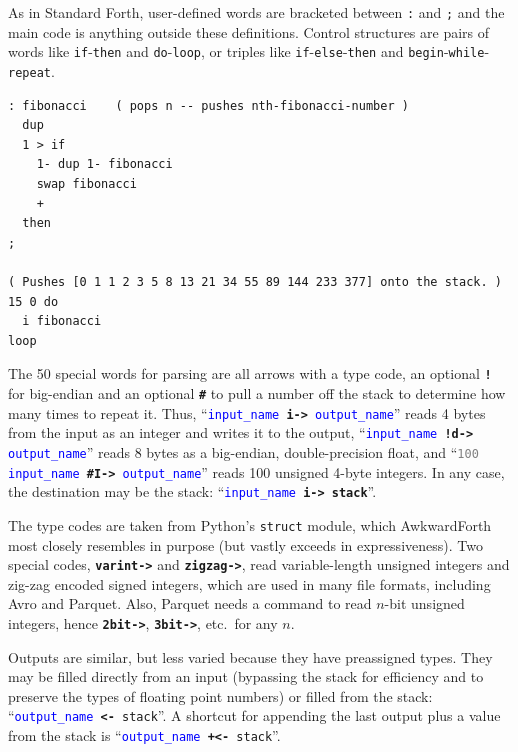 \documentclass{webofc}
\begin{document}
As in Standard Forth, user-defined words are bracketed between \texttt{:} and \texttt{;} and the main code is anything outside these definitions. Control structures are pairs of words like \texttt{if}-\texttt{then} and \texttt{do}-\texttt{loop}, or triples like \texttt{if}-\texttt{else}-\texttt{then} and \texttt{begin}-\texttt{while}-\texttt{repeat}.

\begin{verbatim}
: fibonacci    ( pops n -- pushes nth-fibonacci-number )
  dup
  1 > if
    1- dup 1- fibonacci
    swap fibonacci
    +
  then
;

( Pushes [0 1 1 2 3 5 8 13 21 34 55 89 144 233 377] onto the stack. )
15 0 do
  i fibonacci
loop
\end{verbatim}

The 50 special words for parsing are all arrows with a type code, an optional \textcolor{OliveGreen}{\tt\textbf{!}} for big-endian and an optional \textcolor{OliveGreen}{\tt\textbf{\#}} to pull a number off the stack to determine how many times to repeat it. Thus, ``{\tt \textcolor{blue}{input\_name} \textcolor{OliveGreen}{\textbf{i->}} \textcolor{blue}{output\_name}}'' reads 4 bytes from the input as an integer and writes it to the output, ``{\tt \textcolor{blue}{input\_name} \textcolor{OliveGreen}{\textbf{!d->}} \textcolor{blue}{output\_name}}'' reads 8 bytes as a big-endian, double-precision float, and ``{\tt \textcolor{gray}{100} \textcolor{blue}{input\_name} \textcolor{OliveGreen}{\textbf{\#I->}} \textcolor{blue}{output\_name}}'' reads 100 unsigned 4-byte integers. In any case, the destination may be the stack: ``{\tt \textcolor{blue}{input\_name} \textcolor{OliveGreen}{\textbf{i->}} \textcolor{OliveGreen}{\textbf{stack}}}''.

The type codes are taken from Python's \texttt{struct} module, which AwkwardForth most closely resembles in purpose (but vastly exceeds in expressiveness). Two special codes, \textcolor{OliveGreen}{\tt\textbf{varint->}} and \textcolor{OliveGreen}{\tt\textbf{zigzag->}}, read variable-length unsigned integers and zig-zag encoded signed integers, which are used in many file formats, including Avro and Parquet. Also, Parquet needs a command to read $n$-bit unsigned integers, hence \textcolor{OliveGreen}{\tt\textbf{2bit->}}, \textcolor{OliveGreen}{\tt\textbf{3bit->}}, etc.\ for any $n$.

Outputs are similar, but less varied because they have preassigned types. They may be filled directly from an input (bypassing the stack for efficiency and to preserve the types of floating point numbers) or filled from the stack: ``{\tt \textcolor{blue}{output\_name} \textcolor{OliveGreen}{\textbf{<-}} \textcolor{OliveGreen}{stack}}''. A shortcut for appending the last output plus a value from the stack is ``{\tt \textcolor{blue}{output\_name} \textcolor{OliveGreen}{\textbf{+<-}} \textcolor{OliveGreen}{stack}}''.
\end{document}
